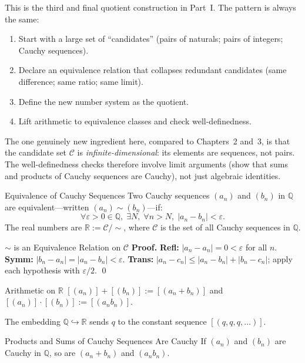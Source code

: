 \documentclass[12pt, openany]{book}
\theoremstyle{plain}
\theoremstyle{definition}
\theoremstyle{remark}
\newcommand{\Q}{\mathbb{Q}}
\newcommand{\R}{\mathbb{R}}
\newcommand{\eps}{\varepsilon}
\begin{document}
This is the third and final quotient construction in Part~I.  The pattern is always the same:
\begin{enumerate}[noitemsep]
  \item Start with a large set of ``candidates'' (pairs of naturals; pairs of integers; Cauchy sequences).
  \item Declare an equivalence relation that collapses redundant candidates (same difference; same ratio; same limit).
  \item Define the new number system as the quotient.
  \item Lift arithmetic to equivalence classes and check well-definedness.
\end{enumerate}

The one genuinely new ingredient here, compared to Chapters~2 and~3, is that the candidate set $\mathcal{C}$ is \emph{infinite-dimensional}: its elements are sequences, not pairs.  The well-definedness checks therefore involve limit arguments (show that sums and products of Cauchy sequences are Cauchy), not just algebraic identities.

\begin{defbox}{Equivalence of Cauchy Sequences}
Two Cauchy sequences $(a_n)$ and $(b_n)$ in $\Q$ are equivalent---written $(a_n) \sim (b_n)$---if:
\[ \forall \eps > 0 \in \Q,\; \exists N,\; \forall n > N,\; |a_n - b_n| < \eps. \]
The real numbers are $\R := \mathcal{C}/{\sim}$, where $\mathcal{C}$ is the set of all Cauchy sequences in $\Q$.
\end{defbox}
\color{black}

\begin{thmbox}{$\sim$ is an Equivalence Relation on $\mathcal{C}$}
\textbf{Proof.}
\textbf{Refl:} $|a_n - a_n| = 0 < \eps$ for all $n$.
\textbf{Symm:} $|b_n - a_n| = |a_n - b_n| < \eps$.
\textbf{Trans:} $|a_n - c_n| \leq |a_n - b_n| + |b_n - c_n|$; apply each
hypothesis with $\eps/2$. \qed
\end{thmbox}
\color{black}

\begin{defbox}{Arithmetic on $\R$}
$[(a_n)] + [(b_n)] := [(a_n + b_n)]$ \quad and \quad $[(a_n)] \cdot [(b_n)] := [(a_n b_n)]$.

The embedding $\Q \hookrightarrow \R$ sends $q$ to the constant sequence $[(q, q, q, \ldots)]$.
\end{defbox}
\color{black}

\begin{thmbox}{Products and Sums of Cauchy Sequences Are Cauchy}
If $(a_n)$ and $(b_n)$ are Cauchy in $\Q$, so are $(a_n + b_n)$ and $(a_n b_n)$.
\end{thmbox}
\color{black}
\end{document}
